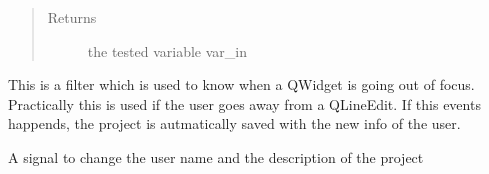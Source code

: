 \documentclass[letterpaper,10pt,english]{sphinxmanual}
\begin{document}
\begin{fulllineitems}
\begin{fulllineitems}
\begin{quote}
\begin{description}
\item[{Returns}] \leavevmode
the tested variable var\_in

\end{description}\end{quote}

\end{fulllineitems}


\end{fulllineitems}


\begin{fulllineitems}
\label{\detokenize{index:src_GUI.Main_windows_1.MyFilter}}
This is a filter which is used to know when a QWidget is going out of focus. Practically this is used
if the user goes away from a QLineEdit. If this events happends, the project is autmatically saved with the new
info of the user.

\begin{fulllineitems}
\label{\detokenize{index:src_GUI.Main_windows_1.MyFilter.eventFilter}}
\end{fulllineitems}


\begin{fulllineitems}
\label{\detokenize{index:src_GUI.Main_windows_1.MyFilter.outfocus_signal}}
A signal to change the user name and the description of the project

\end{fulllineitems}


\end{fulllineitems}

\end{document}
